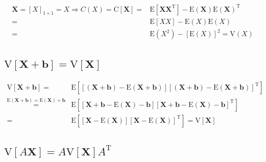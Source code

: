 \documentclass[
]{book}
\theoremstyle{definition}
\theoremstyle{definition}
\theoremstyle{definition}
\theoremstyle{definition}
\theoremstyle{remark}
\begin{document}
\begin{align*}
\boldsymbol{X}=\left[X\right]_{1\times1}=X\Rightarrow C\left(X\right)=\mathrm{C}\left[\boldsymbol{X}\right]= & \mathrm{E}\left[\boldsymbol{X}\boldsymbol{X}^{\mathrm{T}}\right]-\mathrm{E}\left(\boldsymbol{X}\right)\mathrm{E}\left(\boldsymbol{X}\right)^{\mathrm{T}}\\
= & \mathrm{E}\left[XX\right]-\mathrm{E}\left(X\right)\mathrm{E}\left(X\right)\\
= & \mathrm{E}\left(X^{2}\right)-\left[\mathrm{E}\left(X\right)\right]^{2}=\mathrm{V}\left(X\right)
\end{align*}

\subsection{\texorpdfstring{\(\mathrm{V}\left[\boldsymbol{X}+\boldsymbol{b}\right]=\mathrm{V}\left[\boldsymbol{X}\right]\)}{\textbackslash mathrm\{V\}\textbackslash left{[}\textbackslash boldsymbol\{X\}+\textbackslash boldsymbol\{b\}\textbackslash right{]}=\textbackslash mathrm\{V\}\textbackslash left{[}\textbackslash boldsymbol\{X\}\textbackslash right{]}}}\label{mathrmvleftboldsymbolxboldsymbolbrightmathrmvleftboldsymbolxright}

\begin{align*}
\mathrm{V}\left[\boldsymbol{X}+\boldsymbol{b}\right]= & \mathrm{E}\left[\left[\left(\boldsymbol{X}+\boldsymbol{b}\right)-\mathrm{E}\left(\boldsymbol{X}+\boldsymbol{b}\right)\right]\left[\left(\boldsymbol{X}+\boldsymbol{b}\right)-\mathrm{E}\left(\boldsymbol{X}+\boldsymbol{b}\right)\right]^{\mathrm{T}}\right]\\
\overset{\mathrm{E}\left(\boldsymbol{X}+\boldsymbol{b}\right)=\mathrm{E}\left(\boldsymbol{X}\right)+\boldsymbol{b}}{=} & \mathrm{E}\left[\left[\boldsymbol{X}+\boldsymbol{b}-\mathrm{E}\left(\boldsymbol{X}\right)-\boldsymbol{b}\right]\left[\boldsymbol{X}+\boldsymbol{b}-\mathrm{E}\left(\boldsymbol{X}\right)-\boldsymbol{b}\right]^{\mathrm{T}}\right]\\
= & \mathrm{E}\left[\left[\boldsymbol{X}-\mathrm{E}\left(\boldsymbol{X}\right)\right]\left[\boldsymbol{X}-\mathrm{E}\left(\boldsymbol{X}\right)\right]^{\mathrm{T}}\right]=\mathrm{V}\left[\boldsymbol{X}\right]
\end{align*}

\subsection{\texorpdfstring{\(\mathrm{V}\left[A\boldsymbol{X}\right]=A\mathrm{V}\left[\boldsymbol{X}\right]A^{\mathrm{T}}\)}{\textbackslash mathrm\{V\}\textbackslash left{[}A\textbackslash boldsymbol\{X\}\textbackslash right{]}=A\textbackslash mathrm\{V\}\textbackslash left{[}\textbackslash boldsymbol\{X\}\textbackslash right{]}A\^{}\{\textbackslash mathrm\{T\}\}}}\label{mathrmvleftaboldsymbolxrightamathrmvleftboldsymbolxrightamathrmt}
\end{document}
